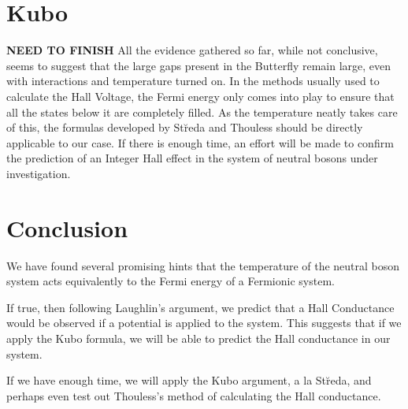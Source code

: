 \documentclass[12pt]{article}
\begin{document}
\section{Kubo}
\textbf{NEED TO FINISH}
All the evidence gathered so far, while not conclusive, seems to suggest
that the large gaps present in the Butterfly remain large, even with
interactions and temperature turned on.
In the methods usually used to calculate the Hall Voltage, the Fermi energy
only comes into play to ensure that all the states below it are completely filled.
As the temperature neatly takes care of this, the formulas developed by
St\u{r}eda and Thouless should be directly applicable to our case.
If there is enough time, an effort will be made to confirm the prediction
of an Integer Hall effect in the system of neutral bosons under investigation.
\section{Conclusion}
We have found several promising hints that the temperature of the
neutral boson system acts equivalently to the Fermi energy of a Fermionic
system.

If true, then following Laughlin's argument, we predict that a Hall
Conductance
would be observed if a potential is applied to the system.
This suggests that if we apply the Kubo formula, we will be able to
predict the Hall conductance in our system.

If we have enough time, we will apply the Kubo argument, a la St\u{r}eda,
and perhaps even test out Thouless's method of calculating the Hall
conductance.



\end{document}
